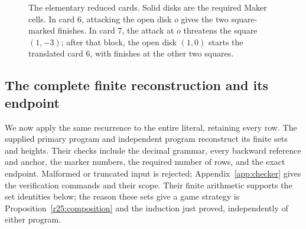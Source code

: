 \begin{figure}[htbp]
\centering
{}
\caption{The elementary reduced cards.  Solid disks are the required
Maker cells.  In card $6$, attacking the open disk $o$ gives the two
square-marked finishes.  In card $7$, the attack at $o$ threatens the
square $(1,-3)$; after that block, the open disk $(1,0)$ starts the
translated card $6$, with finishes at the other two squares.}
\label{r25:elementary-figure}
\end{figure}

\subsection{The complete finite reconstruction and its endpoint}
\label{r25:reconstruction}

We now apply the same recurrence to the entire literal, retaining
every row.  The supplied primary program
 and independent
program 
reconstruct its finite sets and heights.  Their checks include the
decimal grammar, every backward reference and anchor, the marker
numbers, the required number of rows, and the exact endpoint.
Malformed or truncated input is rejected; Appendix~\ref{app:checker}
gives the verification commands and their scope.  Their finite arithmetic
supports the set identities below; the reason these sets give a game
strategy is Proposition~\ref{r25:composition} and the induction just
proved, independently of either program.

